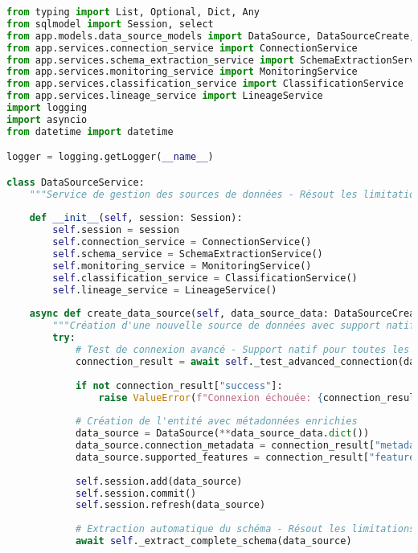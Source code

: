 \begin{lstlisting}[language=Python, caption=Service DataSourceService - Résolution des Limitations Microsoft Purview]
from typing import List, Optional, Dict, Any
from sqlmodel import Session, select
from app.models.data_source_models import DataSource, DataSourceCreate, DataSourceUpdate
from app.services.connection_service import ConnectionService
from app.services.schema_extraction_service import SchemaExtractionService
from app.services.monitoring_service import MonitoringService
from app.services.classification_service import ClassificationService
from app.services.lineage_service import LineageService
import logging
import asyncio
from datetime import datetime

logger = logging.getLogger(__name__)

class DataSourceService:
    """Service de gestion des sources de données - Résout les limitations Microsoft Purview"""
    
    def __init__(self, session: Session):
        self.session = session
        self.connection_service = ConnectionService()
        self.schema_service = SchemaExtractionService()
        self.monitoring_service = MonitoringService()
        self.classification_service = ClassificationService()
        self.lineage_service = LineageService()
    
    async def create_data_source(self, data_source_data: DataSourceCreate) -> DataSource:
        """Création d'une nouvelle source de données avec support natif multi-BDD"""
        try:
            # Test de connexion avancé - Support natif pour toutes les BDD
            connection_result = await self._test_advanced_connection(data_source_data)
            
            if not connection_result["success"]:
                raise ValueError(f"Connexion échouée: {connection_result['error']}")
            
            # Création de l'entité avec métadonnées enrichies
            data_source = DataSource(**data_source_data.dict())
            data_source.connection_metadata = connection_result["metadata"]
            data_source.supported_features = connection_result["features"]
            
            self.session.add(data_source)
            self.session.commit()
            self.session.refresh(data_source)
            
            # Extraction automatique du schéma - Résout les limitations Purview
            await self._extract_complete_schema(data_source)
            

\end{lstlisting}

